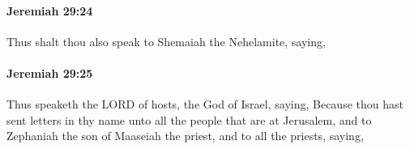 		\paragraph{Jeremiah 29:24} %
			\label{JEREMIAH-29-24}

			Thus shalt thou also speak to Shemaiah the Nehelamite, saying,


		\paragraph{Jeremiah 29:25} %
			\label{JEREMIAH-29-25}

			Thus speaketh the LORD of hosts, the God of Israel, saying, Because thou hast sent letters in thy name unto all the people that are at Jerusalem, and to Zephaniah the son of Maaseiah the priest, and to all the priests, saying,


